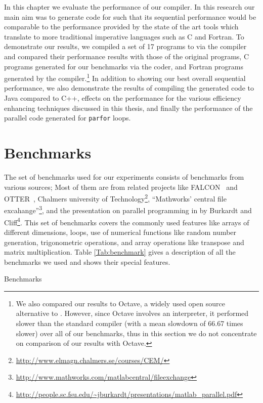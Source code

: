 In this chapter we evaluate the performance of our compiler. In this research
our main aim was to generate \xten code for \matlab such that its sequential
performance would be comparable to the performance provided by the state of the
art tools which translate \matlab to more traditional imperative languages such
as C and Fortran.  To demonstrate our results, we compiled a set of 17 \matlab
programs to \xten via the \mixten compiler and compared their performance
results with those of the original \matlab programs, C programs generated for
our benchmarks via the \matlab coder, and Fortran programs generated by the
\mctwofor compiler.\footnote{We also compared our results to Octave, a widely
used open source alternative to \matlab. However, since Octave involves an
interpreter, it performed slower than the standard \matlab compiler (with a
mean slowdown of 66.67 times slower) over all of our benchmarks, thus in this
section we do not concentrate on comparison of our results with Octave.} In
addition to showing our best overall sequential performance,  we also
demonstrate the results of compiling the generated \xten code to Java compared
to C++, effects on the performance for the various efficiency enhancing
techniques discussed in this thesis, and finally the performance of the parallel
\xten code generated for \matlab \texttt{parfor} loops.

\section{Benchmarks}

The set of benchmarks used for our experiments consists of benchmarks from
various sources; Most of them are from related projects like
FALCON~\cite{falcon} and OTTER~\cite{QMSZ98}, Chalmers university of
Technology\footnote{\url{http://www.elmagn.chalmers.se/courses/CEM/}}, ``Mathworks'
central file
excahange''\footnote{\url{http://www.mathworks.com/matlabcentral/fileexchange}}, and
the presentation on parallel programming in \matlab by Burkardt and
Cliff\footnote{\url{http://people.sc.fsu.edu/~jburkardt/presentations/matlab\_parallel.pdf}}.
This set of benchmarks covers the commonly used \matlab features like arrays of
different dimensions, loops, use of numerical functions like random number
generation, trigonometric operations, and array operations like transpose and
matrix multiplication. Table \ref{Tab:benchmark} gives a description of all the
benchmarks we used and shows their special features.  

\begin{table}
\centering
\scalebox{0.77}{
 
}
\caption{Benchmarks} 
\label{Tab:benchmark}
\end{table}

